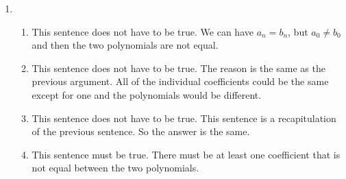 \documentclass[12pt,letterpaper]{article}
\begin{document}
\begin{enumerate}
\begin{enumerate}
\begin{enumerate}
\begin{proof}
                Thus this theorem is not true for all open sentences.
              \end{proof}
          \end{enumerate}
        \item
          \begin{enumerate}
            \item
              This sentence does not have to be true.
              We can have $a_n = b_n$, but $a_0 \neq b_0$ and
              then the two polynomials are not equal.
            \item
              This sentence does not have to be true.
              The reason is the same as the previous argument.
              All of the individual coefficients could be the same
              except for one and the polynomials would be different.
            \item
              This sentence does not have to be true.
              This sentence is a recapitulation of the previous sentence.
              So the answer is the same.
            \item
              This sentence must be true.
              There must be at least one coefficient that is not equal between the two polynomials.
          \end{enumerate}
      \end{enumerate}
  \end{enumerate}
\end{document}
